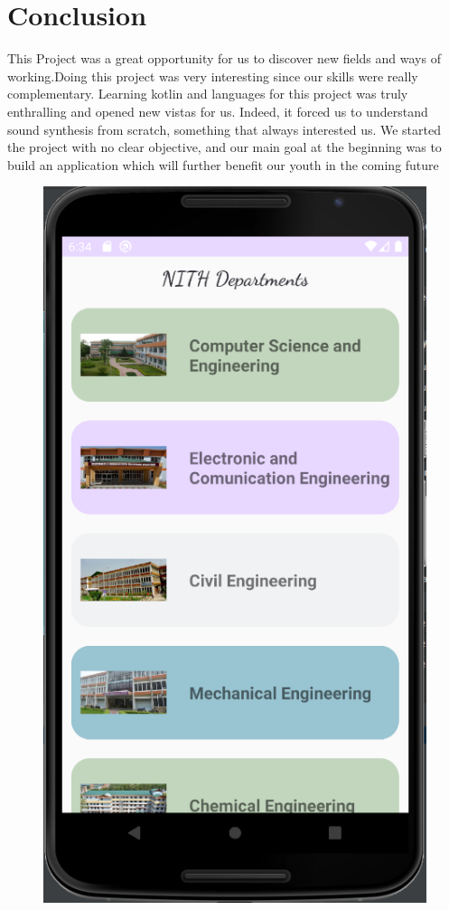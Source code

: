\documentclass[11pt,a4paper]{report}
\begin{document}
		\section*{Conclusion}
		\vskip 1cm
		This Project was a great opportunity for us to discover new fields and ways of working.Doing this project was very interesting since our skills were really complementary. Learning kotlin and languages for this project was truly enthralling and opened new vistas for us. Indeed, it forced us to understand sound synthesis from scratch, something that always interested us. We started the project with no clear objective, and our main goal at the beginning was to build an application which will further benefit our youth in the coming future
		\vskip 0.5cm
		\begin{figure}[H]
  \centering
  \begin{minipage}[b]{0.4\textwidth}
    \includegraphics[width=\textwidth]{Capture1.png}

\end{minipage}
\end{figure}
\end{document}
